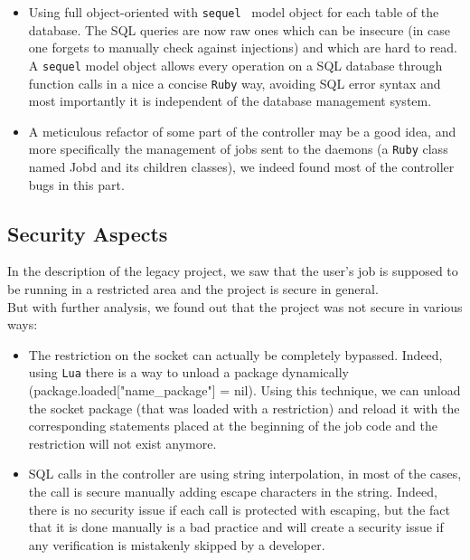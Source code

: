 \documentclass{eplmastersthesis}
\begin{document}
          \begin{itemize}
            \item Using full object-oriented with \texttt{sequel}~\cite{Sequel} model
            object for each table of the database. The SQL queries are now
            raw ones which can be insecure (in case one forgets to manually
            check against injections) and which are hard to read.\\
            A \texttt{sequel} model object allows every operation on a SQL database
            through function calls in a nice a concise \texttt{Ruby} way, avoiding
            SQL error syntax and most importantly it is independent of the
            database management system.
            \item A meticulous refactor of some part of the controller may be
            a good idea, and more specifically the management of jobs sent to
            the daemons (a \texttt{Ruby} class named Jobd and its children classes), we
            indeed found most of the controller bugs in this part.
          \end{itemize}

      \subsection{Security Aspects}

        In the description of the legacy project, we saw that the user's job is
        supposed to be running in a restricted area and the project is secure in
        general.\\
        But with further analysis, we found out that the project was not secure
        in various ways:

        \begin{itemize}
          \item The restriction on the socket can actually be completely
          bypassed. Indeed, using \texttt{Lua} there is a way to unload a package
          dynamically (package.loaded["name\_package"] = nil). Using this
          technique, we can unload the socket package (that was loaded with a
          restriction) and reload it with the corresponding statements placed
          at the beginning of the job code and the restriction will not exist
          anymore.
          \item SQL calls in the controller are using string interpolation,
          in most of the cases, the call is secure manually adding escape
          characters in the string. Indeed, there is no security issue if
          each call is protected with escaping, but the fact that it is done
          manually is a bad practice and will create a security issue if
          any verification is mistakenly skipped by a developer.
        \end{itemize}
\end{document}

